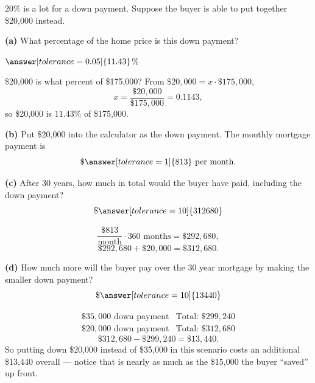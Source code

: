 \documentclass[12pt]{ximera}
\begin{document}
\begin{problem}
$20\%$ is a lot for a down payment. Suppose the buyer is able to put together
\$20,000 instead.

\begin{prompt}
\textbf{(a)} What percentage of the home price is this down payment?
\begin{center}
$\answer[tolerance=0.05]{11.43}$\%
\end{center}
\begin{solution}
\$20,000 is what percent of \$175,000? From $\$20{,}000 = x \cdot \$175{,}000$,
\[
x = \frac{\$20{,}000}{\$175{,}000} = 0.1143,
\]
so \$20,000 is $11.43\%$ of \$175,000.
\end{solution}
\end{prompt}

\begin{prompt}
\textbf{(b)} Put \$20,000 into the calculator as the down payment. The monthly
mortgage payment is
\[
\$\answer[tolerance=1]{813} \text{ per month.}
\]
\end{prompt}

\begin{prompt}
\textbf{(c)} After 30 years, how much in total would the buyer have paid, including
the down payment?
\[
\$\answer[tolerance=10]{312680}
\]
\begin{solution}
\[
\frac{\$813}{\text{month}} \cdot 360 \text{ months} = \$292{,}680,
\]
\[
\$292{,}680 + \$20{,}000 = \$312{,}680.
\]
\end{solution}
\end{prompt}

\begin{prompt}
\textbf{(d)} How much more will the buyer pay over the 30 year mortgage by making the
smaller down payment?
\[
\$\answer[tolerance=10]{13440}
\]
\begin{solution}
\[
\begin{array}{ll}
\$35{,}000 \text{ down payment} & \text{Total: } \$299{,}240 \\
\$20{,}000 \text{ down payment} & \text{Total: } \$312{,}680
\end{array}
\]
\[
\$312{,}680 - \$299{,}240 = \$13{,}440.
\]
So putting down \$20,000 instead of \$35,000 in this scenario costs an additional
\$13,440 overall --- notice that is nearly as much as the \$15,000 the buyer
``saved'' up front.
\end{solution}
\end{prompt}
\end{problem}
\end{document}
